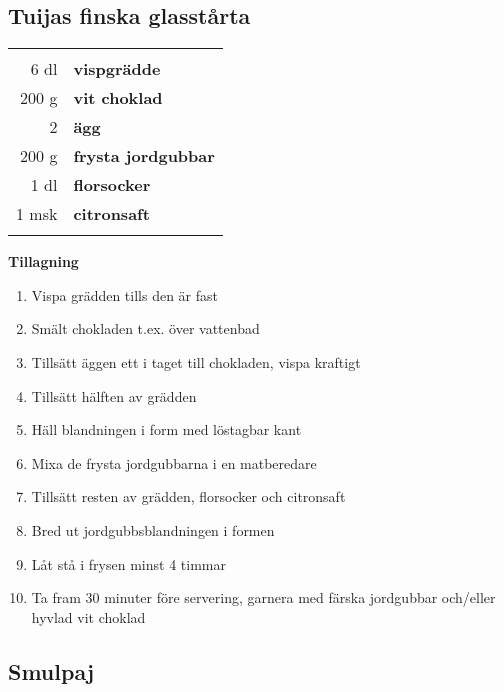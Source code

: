 \clearpage

\subsection{Tuijas finska glasstårta}

\begin{table}[H]
	\begin{tabular}{rl}
	\hline
	&\\
		6 dl & \textbf{vispgrädde}\\
		200 g & \textbf{vit choklad}\\
		2 & \textbf{ägg}\\
		200 g & \textbf{frysta jordgubbar}\\
		1 dl & \textbf{florsocker}\\
		1 msk & \textbf{citronsaft}\\
	&\\
	\hline
	\end{tabular}
\end{table}


\begin{multicols*}{2}

\noindent \textbf{Tillagning}
\begin{enumerate}
	\itemsep0cm
	\item Vispa grädden tills den är fast
	\item Smält chokladen t.ex. över vatten\-bad
	\item Tillsätt äggen ett i taget till chokladen, vispa kraftigt
	\item Tillsätt hälften av grädden
	\item Häll blandningen i form med löstagbar kant
	\item Mixa de frysta jordgubbarna i en matberedare
	\item Tillsätt resten av grädden, florsocker och citronsaft
	\item Bred ut jordgubbsblandningen i formen
	\item Låt stå i frysen minst 4 timmar
	\item Ta fram 30 minuter före \mbox{servering}, garnera med färska jord\-gubbar och/eller hyvlad vit choklad
\end{enumerate}

\end{multicols*}

\clearpage

\subsection{Smulpaj}

